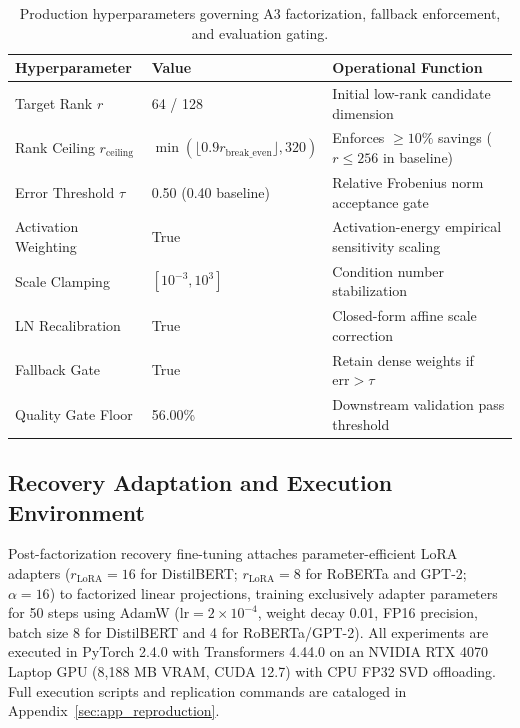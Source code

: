 \begin{table}[H]
\centering
\small
\begin{tabular}{lll}
\toprule
\textbf{Hyperparameter} & \textbf{Value} & \textbf{Operational Function} \\
\midrule
Target Rank $r$ & 64 / 128 & Initial low-rank candidate dimension \\
Rank Ceiling $r_{\mathrm{ceiling}}$ & $\min(\lfloor 0.9 r_{\mathrm{break\_even}}\rfloor, 320)$ & Enforces $\ge 10\%$ savings ($r \le 256$ in baseline) \\
Error Threshold $\tau$ & 0.50 (0.40 baseline) & Relative Frobenius norm acceptance gate \\
Activation Weighting & True & Activation-energy empirical sensitivity scaling \\
Scale Clamping & $[10^{-3}, 10^{3}]$ & Condition number stabilization \\
LN Recalibration & True & Closed-form affine scale correction \\
Fallback Gate & True & Retain dense weights if $\mathrm{err} > \tau$ \\
Quality Gate Floor & 56.00\% & Downstream validation pass threshold \\
\bottomrule
\end{tabular}
\caption{Production hyperparameters governing A3 factorization, fallback enforcement, and evaluation gating.}
\label{tab:a3_hyperparameters}
\end{table}

\subsection{Recovery Adaptation and Execution Environment}

Post-factorization recovery fine-tuning attaches parameter-efficient LoRA adapters ($r_\text{LoRA} = 16$ for DistilBERT; $r_\text{LoRA} = 8$ for RoBERTa and GPT-2; $\alpha = 16$) to factorized linear projections, training exclusively adapter parameters for 50 steps using AdamW ($\mathrm{lr} = 2\times 10^{-4}$, weight decay 0.01, FP16 precision, batch size 8 for DistilBERT and 4 for RoBERTa/GPT-2). All experiments are executed in PyTorch 2.4.0 with Transformers 4.44.0 on an NVIDIA RTX 4070 Laptop GPU (8,188 MB VRAM, CUDA 12.7) with CPU FP32 SVD offloading. Full execution scripts and replication commands are cataloged in Appendix~\ref{sec:app_reproduction}.


